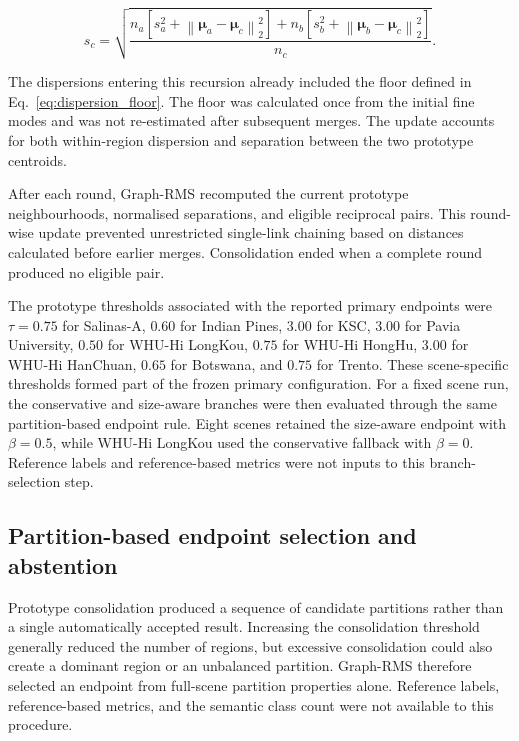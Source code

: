 \documentclass[10pt,a4paper,fleqn]{article}
\begin{document}
\begin{equation}
s_c
=
\sqrt{
\frac{
n_a
\left[
s_a^2+
\left\|
\boldsymbol{\mu}_a-\boldsymbol{\mu}_c
\right\|_2^2
\right]
+
n_b
\left[
s_b^2+
\left\|
\boldsymbol{\mu}_b-\boldsymbol{\mu}_c
\right\|_2^2
\right]
}{
n_c
}
}.
\label{eq:pooled_dispersion}
\end{equation}

The dispersions entering this recursion already included the floor defined in
Eq.~\eqref{eq:dispersion_floor}. The floor was calculated once from the
initial fine modes and was not re-estimated after subsequent merges. The
update accounts for both within-region dispersion and separation between the
two prototype centroids.

After each round, Graph-RMS recomputed the current prototype neighbourhoods,
normalised separations, and eligible reciprocal pairs. This round-wise update
prevented unrestricted single-link chaining based on distances calculated
before earlier merges. Consolidation ended when a complete round produced no
eligible pair.

The prototype thresholds associated with the reported primary endpoints were
\(\tau=0.75\) for Salinas-A, \(0.60\) for Indian Pines, \(3.00\) for KSC,
\(3.00\) for Pavia University, \(0.50\) for WHU-Hi LongKou, \(0.75\) for
WHU-Hi HongHu, \(3.00\) for WHU-Hi HanChuan, \(0.65\) for Botswana, and
\(0.75\) for Trento. These scene-specific thresholds formed part of the
frozen primary configuration. For a fixed scene run, the conservative and
size-aware branches were then evaluated through the same partition-based
endpoint rule. Eight scenes retained the size-aware endpoint with
\(\beta=0.5\), while WHU-Hi LongKou used the conservative fallback with
\(\beta=0\). Reference labels and reference-based metrics were not inputs to
this branch-selection step.


\subsection{Partition-based endpoint selection and abstention}
\label{subsec:endpoint_selection}

Prototype consolidation produced a sequence of candidate partitions rather
than a single automatically accepted result. Increasing the consolidation
threshold generally reduced the number of regions, but excessive consolidation
could also create a dominant region or an unbalanced partition. Graph-RMS
therefore selected an endpoint from full-scene partition properties alone.
Reference labels, reference-based metrics, and the semantic class count were
not available to this procedure.
\end{document}
